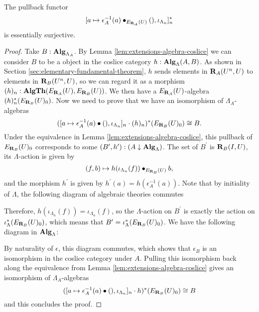 \begin{lemma}\label{lem:pullback-essentially-surjective}
  The pullback functor
  \[ [a \mapsto \epsilon_A^{-1}(a) \bullet_{E_{\mathbf{R}_A}(U)} (), \iota_{\Lambda_n}]_n^* \]
  is essentially surjective.
\end{lemma}
\begin{proof}
  Take $ B : \mathbf{Alg}_{\Lambda_A} $. By Lemma \ref{lem:extensions-algebra-coslice} we can consider $ B $ to be a object in the coslice category $ h : \mathbf{Alg}_{\Lambda}(A, B) $. As shown in Section \ref{sec:elementary-fundamental-theorem}, $ h $ sends elements in $ \mathbf{R}_A(U^n, U) $ to elements in $ \mathbf{R}_B(U^n, U) $, so we can regard it as a morphism $ (h)_n: \mathbf{AlgTh}(E_{\mathbf{R}_A}(U), E_{\mathbf{R}_B}(U)) $. We then have a $ E_{\mathbf{R}_A}(U) $-algebra $ (h)_n^*(E_{\mathbf{R}_B}(U)_0) $. Now we need to prove that we have an isomorphism of $ \Lambda_A $-algebras
  \[ ([a \mapsto \epsilon_A^{-1}(a) \bullet (), \iota_{\Lambda_n}]_n \cdot (h)_n)^*(E_{\mathbf{R}_B}(U)_0) \cong B. \]
  Under the equivalence in Lemma \ref{lem:extensions-algebra-coslice}, this pullback of $ E_{\mathbf{R}_B}(U)_0 $ corresponds to some $ (B^\prime, h^\prime) : (A \downarrow \mathbf{Alg}_{\Lambda}) $. The set of $ B^\prime $ is $ \mathbf{R}_B(I, U) $, its $ \Lambda $-action is given by
  \[ (f, b) \mapsto h(\iota_{\Lambda_n}(f)) \bullet_{E_{\mathbf{R}_B}(U)} b, \]
  and the morphism $ h^\prime $ is given by $ h^\prime(a) = h(\epsilon_A^{-1}(a)) $. Note that by initiality of $ \Lambda $, the following diagram of algebraic theories commutes
  \begin{center}
  \end{center}
  Therefore, $ h(\iota_{\Lambda_n}(f)) = \iota_{\Lambda_n}(f) $, so the $ \Lambda $-action on $ B^\prime $ is exactly the action on $ \iota_\Lambda^*(E_{\mathbf{R}_B}(U)_0) $, which means that $ B^\prime = \iota_\Lambda^*(E_{\mathbf{R}_B}(U)_0) $. We have the following diagram in $ \mathbf{Alg}_{\Lambda} $:
  \begin{center}
  \end{center}
  By naturality of $ \epsilon $, this diagram commutes, which shows that $ \epsilon_B $ is an isomorphism in the coslice category under $ A $. Pulling this isomorphism back along the equivalence from Lemma \ref{lem:extensions-algebra-coslice} gives an isomorphism of $ \Lambda_A $-algebras
  \[ ([a \mapsto \epsilon_A^{-1}(a) \bullet (), \iota_{\Lambda_n}]_n \cdot h)^*(E_{\mathbf{R}_B}(U)_0) \cong B \]
  and this concludes the proof.
\end{proof}

